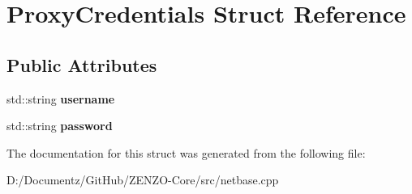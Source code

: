 \hypertarget{struct_proxy_credentials}{}\section{Proxy\+Credentials Struct Reference}
\label{struct_proxy_credentials}
\subsection*{Public Attributes}
\begin{DoxyCompactItemize}
\item 
\mbox{\label{struct_proxy_credentials_a1b5e426884ddec6a55c60561c1e85c6a}} 
std\+::string {\bfseries username}
\item 
\mbox{\label{struct_proxy_credentials_a380630fa3a709e51f7a692e757c876d7}} 
std\+::string {\bfseries password}
\end{DoxyCompactItemize}


The documentation for this struct was generated from the following file\+:\begin{DoxyCompactItemize}
\item 
D\+:/\+Documentz/\+Git\+Hub/\+Z\+E\+N\+Z\+O-\/\+Core/src/netbase.\+cpp\end{DoxyCompactItemize}
